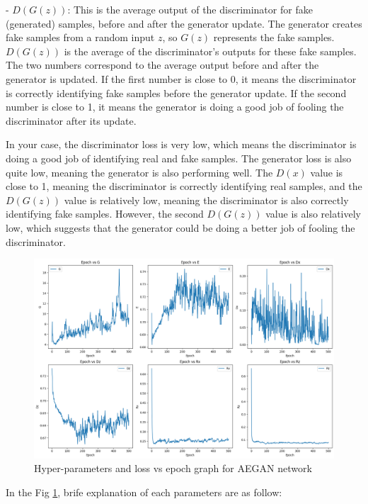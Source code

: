 \documentclass[letterpaper]{article} %
\begin{document}
- $D(G(z))$: This is the average output of the discriminator for fake (generated) samples, before and after the generator update. The generator creates fake samples from a random input $z$, so $G(z)$ represents the fake samples. $D(G(z))$ is the average of the discriminator's outputs for these fake samples. The two numbers correspond to the average output before and after the generator is updated. If the first number is close to 0, it means the discriminator is correctly identifying fake samples before the generator update. If the second number is close to 1, it means the generator is doing a good job of fooling the discriminator after its update.

In your case, the discriminator loss is very low, which means the discriminator is doing a good job of identifying real and fake samples. The generator loss is also quite low, meaning the generator is also performing well. The $D(x)$ value is close to 1, meaning the discriminator is correctly identifying real samples, and the $D(G(z))$ value is relatively low, meaning the discriminator is also correctly identifying fake samples. However, the second $D(G(z))$ value is also relatively low, which suggests that the generator could be doing a better job of fooling the discriminator.
\begin{figure}[htbp]
\captionsetup[subfigure]{justification=centering}
  \centering
  \includegraphics[scale = 0.2]{image/AEGAN loss.png}
  \caption{Hyper-parameters and loss vs epoch graph for AEGAN network}\label{fig:AEloss}
\end{figure}

In the Fig \ref{fig:AEloss}, brife explanation of each parameters are as follow: 
\end{document}
